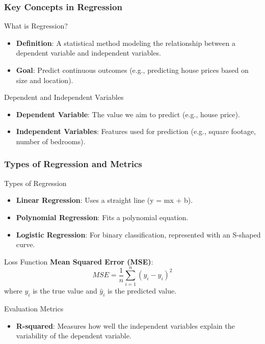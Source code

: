 \documentclass[aspectratio=169]{beamer}
\begin{document}
\begin{frame}[fragile]
    \frametitle{Key Concepts in Regression}
    \begin{block}{What is Regression?}
        \begin{itemize}
            \item \textbf{Definition}: A statistical method modeling the relationship between a dependent variable and independent variables.
            \item \textbf{Goal}: Predict continuous outcomes (e.g., predicting house prices based on size and location).
        \end{itemize}
    \end{block}
    \begin{block}{Dependent and Independent Variables}
        \begin{itemize}
            \item \textbf{Dependent Variable}: The value we aim to predict (e.g., house price).
            \item \textbf{Independent Variables}: Features used for prediction (e.g., square footage, number of bedrooms).
        \end{itemize}
    \end{block}
\end{frame}

\begin{frame}[fragile]
    \frametitle{Types of Regression and Metrics}
    \begin{block}{Types of Regression}
        \begin{itemize}
            \item \textbf{Linear Regression}: Uses a straight line (y = mx + b).
            \item \textbf{Polynomial Regression}: Fits a polynomial equation.
            \item \textbf{Logistic Regression}: For binary classification, represented with an S-shaped curve.
        \end{itemize}
    \end{block}
    \begin{block}{Loss Function}
        \textbf{Mean Squared Error (MSE)}:
        \begin{equation}
        MSE = \frac{1}{n} \sum_{i=1}^{n} (y_i - \hat{y}_i)^2
        \end{equation}
        where \(y_i\) is the true value and \(\hat{y}_i\) is the predicted value.
    \end{block}
    \begin{block}{Evaluation Metrics}
        \begin{itemize}
            \item \textbf{R-squared}: Measures how well the independent variables explain the variability of the dependent variable.
        \end{itemize}
    \end{block}
\end{frame}
\end{document}
